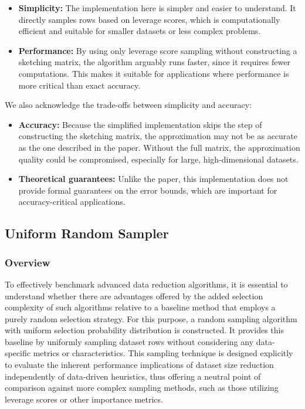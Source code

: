 \documentclass{article}
\theoremstyle{plain}
\theoremstyle{definition}
\theoremstyle{remark}
\begin{document}
\begin{itemize}

\item \textbf{Simplicity:} The implementation here is simpler and easier to understand. It directly samples rows based on leverage scores, which is computationally efficient and suitable for smaller datasets or less complex problems.

\item \textbf{Performance:} By using only leverage score sampling without constructing a sketching matrix, the algorithm arguably runs faster, since it requires fewer computations. This makes it suitable for applications where performance is more critical than exact accuracy.

\end{itemize}

We also acknowledge the trade-offs between simplicity and accuracy:

\begin{itemize}

\item \textbf{Accuracy:} Because the simplified implementation skips the step of constructing the sketching matrix, the approximation may not be as accurate as the one described in the paper. Without the full matrix, the approximation quality could be compromised, especially for large, high-dimensional datasets.

\item \textbf{Theoretical guarantees:} Unlike the paper, this implementation does not provide formal guarantees on the error bounds, which are important for accuracy-critical applications.

\end{itemize}


\subsection{Uniform Random Sampler}

\subsubsection{Overview}

To effectively benchmark advanced data reduction algorithms, it is essential to understand whether there are advantages offered by the added selection complexity of such algorithms relative to a baseline method that employs a purely random selection strategy. For this purpose, a random sampling algorithm with uniform selection probability distribution is constructed. It provides this baseline by uniformly sampling dataset rows without considering any data-specific metrics or characteristics. This sampling technique is designed explicitly to evaluate the inherent performance implications of dataset size reduction independently of data-driven heuristics, thus offering a neutral point of comparison against more complex sampling methods, such as those utilizing leverage scores or other importance metrics.
\end{document}
